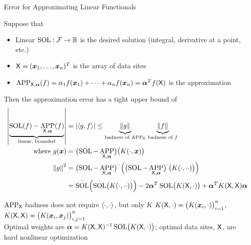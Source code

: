 \documentclass[10pt,compress,xcolor={usenames,dvipsnames},aspectratio=169]{beamer}
\DeclareMathOperator{\SOL}{SOL}
\DeclareMathOperator{\APP}{APP}
\begin{document}
\begin{frame}{Error for Approximating Linear Functionals}

\vspace{-4ex}
Suppose that 

\vspace{-2ex}
\begin{itemize}
    \item Linear $\SOL : \cf \to \reals$ is the desired \alert{solution} (integral, derivative at a point, etc.)
    
    \item $\mathsf{X} = (\boldsymbol{x}_1, \ldots, \boldsymbol{x}_n)^T$ is the array of \alert{data sites}
    
    \item $\APP_{\mX,\valpha}(f) = \alpha_{1} f(\vx_1) + \cdots + \alpha_{n} f(\vx_n) = \valpha^T f(\mX)$ is the \alert{approximation}
\end{itemize}

\vspace{-2ex}
Then the approximation error has a tight upper bound of
\begin{align*}
    \abs{\underbrace{\SOL(f) - \APP_{\mX,\valpha}(f)}_{\text{linear, bounded}}} &= \abs{\ip{g}{f}} \le \underbrace{\norm{g}}_{\text{badness of $\APP_\mX$}} \, \underbrace{\norm{f}}_{\text{badness of $f$}} \\
    \text{where } g(\vx) &= \bigl(\SOL - \APP_{\mX,\valpha} \bigr) \bigl(K(\cdot,\vx) \bigr) \\
    \norm{g}^2 & = \bigl(\SOL - \APP_{\mX,\valpha} \bigr)^{\cdot\cdot} \Bigl( \bigl(\SOL - \APP_{\mX,\valpha} \bigr)^\cdot\bigl(K(\cdot,\cdot \cdot)\bigr)   \Bigr) \\
    & = \SOL^{\cdot\cdot} \Bigl(\SOL^\cdot\bigl(K(\cdot,\cdot \cdot)\bigr) \Bigr)
    - 2 \valpha^T \SOL\bigl(K(\mX,\cdot) \bigr) + \valpha^T K(\mX,\mX) \valpha
\end{align*}

\vspace{-4ex}
$\APP_\mX$ badness does not require $\left \langle \cdot, \cdot \right \rangle_{{}}$, but \alert{only $K$} \hfill
$K(\mathsf{X},\cdot) = \bigl(K(\boldsymbol{x}_i,\cdot)\bigr)_{i = 1}^n$, $K(\mathsf{X},\mathsf{X}) = \bigl(K(\boldsymbol{x}_i,\boldsymbol{x}_j)\bigr)_{i,j = 1}^n$ \\
Optimal weights are $\valpha = K(\mX,\mX)^{-1} \SOL\bigl(K(\mX,\cdot) \bigr)$; optimal data sites,  $\mathsf{X}$, are \alert{hard} nonlinear optimization
\end{frame}
\end{document}
